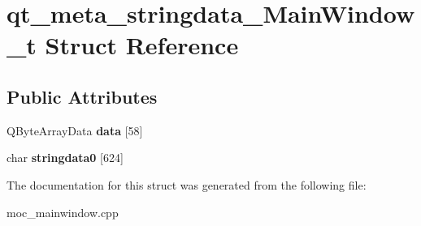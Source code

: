 \hypertarget{structqt__meta__stringdata___main_window__t}{}\section{qt\+\_\+meta\+\_\+stringdata\+\_\+\+Main\+Window\+\_\+t Struct Reference}
\label{structqt__meta__stringdata___main_window__t}
\subsection*{Public Attributes}
\begin{DoxyCompactItemize}
\item 
\hypertarget{structqt__meta__stringdata___main_window__t_ad10b8031cf6571bb2f0d30f1e80302b6}{}Q\+Byte\+Array\+Data {\bfseries data} \mbox{[}58\mbox{]}\label{structqt__meta__stringdata___main_window__t_ad10b8031cf6571bb2f0d30f1e80302b6}

\item 
\hypertarget{structqt__meta__stringdata___main_window__t_a912e7c17114daf95f52c2f0738eb5ee8}{}char {\bfseries stringdata0} \mbox{[}624\mbox{]}\label{structqt__meta__stringdata___main_window__t_a912e7c17114daf95f52c2f0738eb5ee8}

\end{DoxyCompactItemize}


The documentation for this struct was generated from the following file\+:\begin{DoxyCompactItemize}
\item 
moc\+\_\+mainwindow.\+cpp\end{DoxyCompactItemize}
